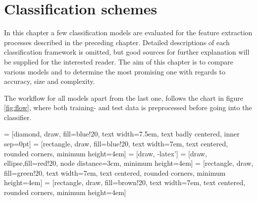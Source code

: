 \chapter{Classification schemes}
In this chapter a few classification models are evaluated for the feature extraction processes described in the preceding chapter. Detailed descriptions of each classification framework is omitted, but good sources for further explanation will be supplied for the interested reader. The aim of this chapter is to compare various models and to determine the most promising one with regards to accuracy, size and complexity. 

The workflow for all models apart from the last one, follows the chart in figure \ref{fig:flow}, where both training- and test data is preprocessed before going into the classifier. 





 = [diamond, draw, fill=blue!20, 
    text width=7.5em, text badly centered, inner sep=0pt]
 = [rectangle, draw, fill=blue!20, 
    text width=7em, text centered, rounded corners, minimum height=4em]
 = [draw, -latex']
 = [draw, ellipse,fill=red!20, node distance=3cm,
    minimum height=4em]
 = [rectangle, draw, fill=green!20, 
    text width=7em, text centered, rounded corners, minimum height=4em]
 = [rectangle, draw, fill=brown!20, 
    text width=7em, text centered, rounded corners, minimum height=4em]

